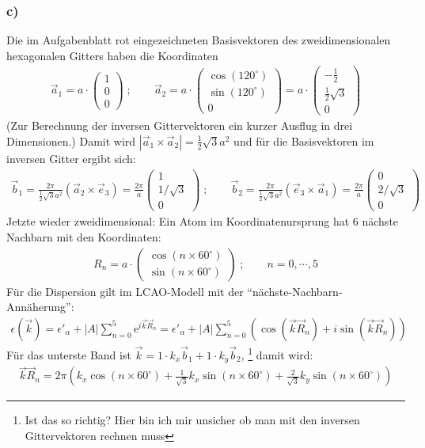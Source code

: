 \subsubsection*{c)}
Die im Aufgabenblatt rot eingezeichneten Basisvektoren des zweidimensionalen
hexagonalen Gitters haben die Koordinaten
\begin{align*}
  \vec a_1 = a \cdot \begin{pmatrix} 1 \\ 0 \\ 0 \end{pmatrix} \;; \qquad
  \vec a_2 = a \cdot \begin{pmatrix} \cos(120^\circ)\\ \sin(120^\circ)\\ 0\end{pmatrix} =
  a \cdot \begin{pmatrix} -\frac{1}{2}\\\frac{1}{2} \sqrt{3}\\ 0 \end{pmatrix}
\end{align*}
(Zur Berechnung der inversen Gittervektoren ein kurzer Ausflug in drei Dimensionen.)
Damit wird $ | \vec a_1 \times \vec a_2 | = \frac{1}{2} \sqrt{3} a^2$ und für die
Basisvektoren im inversen Gitter ergibt sich:
\begin{align*}
\vec b_1 =  \frac{2 \pi}{\frac{1}{2} \sqrt{3} a^2} (\vec a_2 \times \vec e_3 ) =
  \frac{2 \pi}{a} \begin{pmatrix} 1 \\ 1 / \sqrt{3} \\ 0 \end{pmatrix} \;; \qquad
  \vec b_2 =  \frac{2 \pi}{\frac{1}{2} \sqrt{3} a^2} (\vec e_3 \times \vec a_1) =
  \frac{2 \pi}{a} \begin{pmatrix} 0 \\ 2 / \sqrt{3} \\ 0 \end{pmatrix}
\end{align*}
Jetzte wieder zweidimensional: Ein Atom im Koordinatenursprung hat 6 nächste Nachbarn
mit den Koordinaten:
\begin{align*}
  R_n = a \cdot  \begin{pmatrix} \cos(n \times 60^\circ)\\ \sin(n \times 60^\circ) \end{pmatrix}\;; \qquad
  n = 0, \cdots , 5
\end{align*}
Für die Dispersion gilt im LCAO-Modell mit der "`nächste-Nachbarn-Annäherung"':
\begin{align*}
  \epsilon(\vec k) = \epsilon'_\alpha + |A| \sum_{n = 0}^5 \mathrm e^{i \vec k \vec R_n}
  =  \epsilon'_\alpha + |A| \sum_{n = 0}^5 (\cos (\vec k \vec R_n) + i \sin(\vec k \vec R_n))
\end{align*}
Für das unterste Band ist $\vec k = 1 \cdot k_x \vec b_1 + 1 \cdot k_y \vec b_2$,
\footnote{Ist das so richtig? Hier bin ich mir unsicher ob man mit den
inversen Gittervektoren rechnen muss}
damit wird:
\begin{align*}
  \vec k \vec R_n =  2 \pi \left(k_x\cos(n \times 60^\circ) + \frac{1}{\sqrt{3}}k_x\sin(n \times 60^\circ) + \frac{2}{\sqrt{3}}k_y \sin(n \times 60^\circ)\right)
\end{align*}
